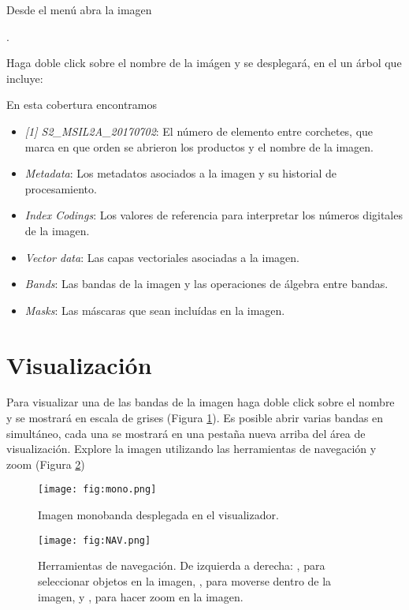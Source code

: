 Desde el menú  abra la imagen
\begin{center} .
\end{center}
Haga doble click sobre el nombre de la imágen y se desplegará, en el  un árbol que incluye:
\\

En esta cobertura encontramos

\begin{itemize}
    \item \emph{[1] S2\_MSIL2A\_20170702}: El número de elemento entre corchetes, que marca en que orden se abrieron los productos y el nombre de la imagen.
    \item \emph{Metadata}: Los metadatos asociados a la imagen y su historial de procesamiento.
    \item \emph{Index Codings}: Los valores de referencia para interpretar los números digitales de la imagen.
    \item \emph{Vector data}: Las capas vectoriales asociadas a la imagen.
    \item \emph{Bands}: Las bandas de la imagen y las operaciones de álgebra entre bandas.
    \item \emph{Masks}: Las máscaras que sean incluídas en la imagen.
\end{itemize}

\section{Visualización}

Para visualizar una de las bandas de la imagen haga doble click sobre el nombre y se mostrará en escala de grises (Figura \ref{fig:mono}). Es posible abrir varias bandas en simultáneo, cada una se mostrará en una pestaña nueva arriba del área de visualización. Explore la imagen utilizando las herramientas de navegación y zoom (Figura \ref{fig:NAV})

\begin{figure}[h!]
    \centering
    \texttt{[image: fig:mono.png]}
    \caption{Imagen monobanda desplegada en el visualizador.}
    \label{fig:mono}
\end{figure}



\begin{figure}[h!]
    \centering
    \texttt{[image: fig:NAV.png]}
    \caption{Herramientas de navegación. De izquierda a derecha: , para seleccionar objetos en la imagen, , para moverse dentro de la imagen, y , para hacer zoom en la imagen.}
    \label{fig:NAV}
\end{figure}

